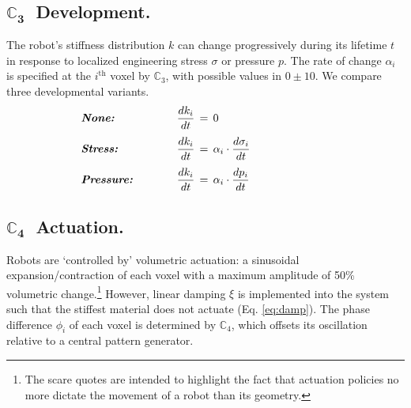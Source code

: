 \subsection{$\mathbf{\mathbb{C}_3}\;$ Development.}
The robot's stiffness distribution $k$ 
can change progressively during its lifetime $t$ in response to localized engineering stress $\sigma$ or pressure $p$.
The rate of change $\alpha_i$ is specified at the $i^{\text{th}}$ voxel by $\mathbb{C}_3$, with possible values in $0\pm10$.
We compare three developmental variants.
\begin{align}
&\textit{\textbf{None:}} 
\hspace{2em} &\frac{dk_i}{dt}& \,=\, 0 
\hspace{10em}
\label{eq:none} \\[0.35em]
&\textit{\textbf{Stress:}} \hspace{3em} &\frac{dk_i}{dt}& \,=\, \alpha_i \cdot \frac{d\sigma_i}{dt} 
\label{eq:stress} \\[0.35em]
&\textit{\textbf{Pressure:}} \hspace{3em} &\frac{dk_i}{dt}& \,=\, \alpha_i \cdot \frac{dp_i}{dt} 
\label{eq:pressure}
\end{align}

\subsection{$\mathbf{\mathbb{C}_4}\;$ Actuation.}
Robots are `controlled by' volumetric actuation: a sinusoidal expansion/contraction of each voxel with a maximum amplitude of 50\% volumetric change.\footnote{The scare quotes are intended to highlight the fact that actuation policies no more dictate the movement of a robot than its geometry.}
However, linear damping $\xi$ is implemented into the system such that the stiffest material does not actuate (Eq. \ref{eq:damp}). 
The phase difference $\phi_i$ of each voxel is determined by $\mathbb{C}_4$, which offsets its oscillation relative to a central pattern generator.

